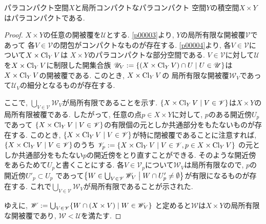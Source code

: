 \documentclass[uplatex, dvipdfmx, a4paper, 12pt, class=jsbook, crop=false]{standalone}
\begin{document}
\begin{proposition}
	パラコンパクト空間$ X $と局所コンパクトなパラコンパクト  空間$ Y $の積空間$ X \times Y $はパラコンパクトである.
\end{proposition}

\begin{proof}
	$ X \times Y $の任意の開被覆を$ \mathscr{U} $とする.
	\cref{p00003}より, $ Y $の局所有限な開被覆$ \mathscr{V} $であって
	各$ V \in \mathscr{V} $の閉包がコンパクトなものが存在する.
	\cref{p00004}より, 各$ V \in \mathscr{V} $について$ X \times \mathop{\mathrm{Cl}}\nolimits_Y V $は
	$ X \times Y $のパラコンパクトな部分空間である.
	$ V \in \mathscr{V} $に対して$ \mathscr{U} $を$ X \times \mathop{\mathrm{Cl}}\nolimits_Y V $に制限した開集合族
	$ \mathscr{U}_V \defeq \setcomp{(X \times \topcl_Y V) \cap U}{U \in \mathscr{U}} $は
	$ X \times \mathop{\mathrm{Cl}}\nolimits_Y V $の開被覆である. このとき, $ X \times \mathop{\mathrm{Cl}}\nolimits_Y V $の
	局所有限な開被覆$ \mathscr{W}_V $であって$ \mathscr{U}_V $の細分となるものが存在する.

	ここで, $ \bigcup_{V \in \mathscr{V}} \mathscr{W}_V $が局所有限であることを示す.
	$ \setcomp{X \times \topcl_Y V}{V \in \mathscr{V}} $は$ X \times Y $の局所有限被覆である.
	したがって, 任意の点$ p \in X \times Y $に対して, $ p $のある開近傍$ U_p $であって
	$ \setcomp{X \times \topcl_Y V}{V \in \mathscr{V}} $の有限個の元としか共通部分をもたないものが存在する.
	このとき, $ \setcomp{X \times \topcl_Y V}{V \in \mathscr{V}} $が特に閉被覆であることに注意すれば,
	$ \setcomp{X \times \topcl_Y V}{V \in \mathscr{V}} $のうち
	$ \mathscr{V}_p \defeq \setcomp{X \times \topcl_Y V}{V \in \mathscr{V},
	p \in X \times \topcl_Y V} $
	の元としか共通部分をもたない$ p $の開近傍をとり直すことができる.
	そのような開近傍をあらためて$ U_p $と書くことにする.
	各$ V \in \mathscr{V}_p $について$ \mathscr{W}_V $は局所有限なので, $ p $の開近傍$ U'_p \subset U_p $
	であって$ \setcomp{W \in \bigcup_{V \in \mathscr{V}} \mathscr{W}_V}
	{W \cap U'_p \neq \emptyset} $が有限になるものが存在する.
	これで$ \bigcup_{V \in \mathscr{V}} \mathscr{W}_V $が局所有限であることが示された.

	ゆえに, $ \mathscr{W} \defeq \bigcup_{V \in \mathscr{V}} \setcomp{W \cap (X \times V)}{W \in \mathscr{W}_V} $
	と定めると$ \mathscr{W} $は$ X \times Y $の局所有限な開被覆であり, $ \mathscr{W} < \mathscr{U} $を満たす.
\end{proof}
\end{document}
